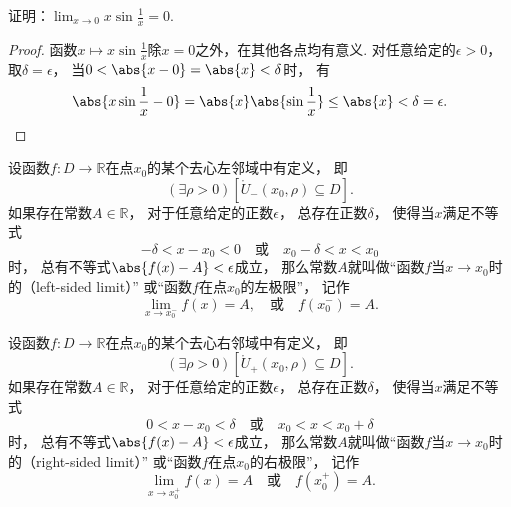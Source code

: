 \begin{example}
证明：\(\lim_{x\to0} x \sin\frac1x = 0\).
\begin{proof}
函数\(x \mapsto x \sin\frac1x\)除\(x=0\)之外，在其他各点均有意义.
对任意给定的\(\epsilon>0\)，
取\(\delta=\epsilon\)，
当\(0<\abs{x-0}=\abs{x}<\delta\)时，
有\begin{equation*}
	\abs{x \sin\frac1x - 0}
	= \abs{x} \abs{\sin\frac1x}
	\leq \abs{x}
	< \delta = \epsilon.
	\qedhere
\end{equation*}
\end{proof}
\end{example}

\begin{definition}\label{definition:极限.函数极限的定义2}
设函数\(f\colon D\to\mathbb{R}\)在点\(x_0\)的某个去心左邻域中有定义，
即\begin{equation*}
	(\exists\rho>0)
	[\mathring{U}_-(x_0,\rho) \subseteq D].
\end{equation*}
如果存在常数\(A\in\mathbb{R}\)，
对于任意给定的正数\(\epsilon\)，
总存在正数\(\delta\)，
使得当\(x\)满足不等式\begin{equation*}
	-\delta < x - x_0 < 0
	\quad\text{或}\quad
	x_0 - \delta < x < x_0
\end{equation*}时，
总有不等式\(\abs{f(x) - A} < \epsilon\)成立，
那么常数\(A\)就叫做“函数\(f\)当\(x \to x_0\)时的（left-sided limit）”
或“函数\(f\)在点\(x_0\)的左极限”，
记作\begin{equation*}
	\lim_{x \to x_0^-} f(x) = A,
	\quad\text{或}\quad
	f(x_0^-) = A.
\end{equation*}
\end{definition}

\begin{definition}\label{definition:极限.函数极限的定义3}
设函数\(f\colon D\to\mathbb{R}\)在点\(x_0\)的某个去心右邻域中有定义，
即\begin{equation*}
	(\exists\rho>0)
	[\mathring{U}_+(x_0,\rho) \subseteq D].
\end{equation*}
如果存在常数\(A\in\mathbb{R}\)，
对于任意给定的正数\(\epsilon\)，
总存在正数\(\delta\)，
使得当\(x\)满足不等式\begin{equation*}
	0 < x - x_0 < \delta
	\quad\text{或}\quad
	x_0 < x < x_0 + \delta
\end{equation*}时，
总有不等式\(\abs{f(x) - A} < \epsilon\)成立，
那么常数\(A\)就叫做“函数\(f\)当\(x \to x_0\)时的（right-sided limit）”
或“函数\(f\)在点\(x_0\)的右极限”，
记作\begin{equation*}
	\lim_{x \to x_0^+} f(x) = A
	\quad\text{或}\quad
	f(x_0^+) = A.
\end{equation*}
\end{definition}

